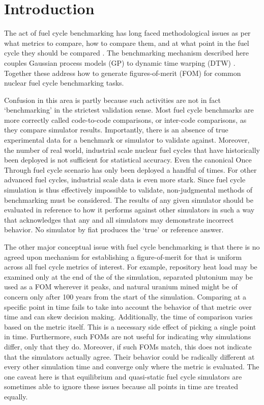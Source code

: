 \section{Introduction}
\label{intro}
The act of fuel cycle benchmarking has long faced methodological issues 
as per what metrics to compare, how to compare them, and at what point in the
fuel cycle they should be compared 
\cite{wilson2011comparing,guerin2009benchmark,piet2011assessment}. 
The benchmarking mechanism described 
here couples Gaussian process models (GP) \cite{rasmussen2006gaussian} to 
dynamic time warping (DTW) \cite{muller}. Together these address how to 
generate figures-of-merit (FOM) for common nuclear fuel cycle benchmarking
tasks. 

Confusion in this area is partly because such activities 
are not in fact `benchmarking' in the strictest validation sense. Most fuel
cycle benchmarks are more correctly called code-to-code comparisons, or 
inter-code comparisons, as they compare simulator results. Importantly, 
there is an absence of true experimental data for a benchmark or simulator
to validate against. Moreover, the number of 
real world, industrial scale nuclear fuel cycles that have historically been 
deployed is not sufficient for statistical accuracy. Even the canonical 
Once Through fuel cycle scenario has only been deployed a handful of times.
For other advanced fuel cycles, industrial scale data is even more stark. 
Since fuel cycle simulation is thus effectively impossible to validate, 
non-judgmental methods of benchmarking must be considered. The 
results of any given simulator should be evaluated in reference to how 
it performs against other simulators in such a way that acknowledges that 
any and all simulators may demonstrate incorrect behavior. No simulator
by fiat produces the `true' or reference answer.

The other major conceptual issue with fuel cycle benchmarking is that there 
is no agreed upon mechanism for establishing a figure-of-merit for 
that is uniform across all fuel cycle metrics of interest. For example, 
repository heat load may be examined only at the end of the of the simulation,
separated plutonium may be used as a FOM wherever it peaks, and natural uranium 
mined might be of concern only after 100 years from the start of the 
simulation. Comparing at a specific point 
in time fails to take into account the behavior of that metric over time and 
can skew decision making. Additionally, the 
time of comparison varies based on the metric itself. This is a necessary 
side effect of picking a single point in time.
Furthermore, such FOMs are not useful for indicating why simulations differ, 
only that they do. Moreover, if such FOMs match, this does not indicate
that the simulators actually agree. Their behavior 
could be radically different at every other simulation time and converge
only where the metric is evaluated.  The one caveat 
here is that 
equilibrium and quasi-static fuel cycle simulators are sometimes able to 
ignore these issues because all points in time are treated equally.

